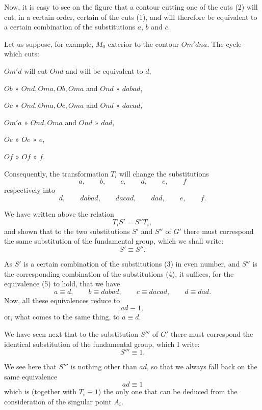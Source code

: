 \documentclass{article}
\begin{document}
Now, it is easy to see on the figure that a contour cutting one of the cuts (2) will cut, in a certain order, certain of the cuts (1), and will therefore be equivalent to a certain combination of the substitutions $a$, $b$ and $c$.

Let us suppose, for example, $M_{0}$ exterior to the contour $Om'dna$. The cycle which cuts:

$Om'd$ will cut $Ond$ and will be equivalent to $d$,

$Ob$ » $Ond, Oma, Ob, Oma$ and $Ond$ » $dabad$,

$Oc$ » $Ond, Oma, Oc, Oma$ and $Ond$ » $dacad$,

$Om'a$ » $Ond, Oma$ and $Ond$ » $dad$,

$Oe$ » $Oe$ » $e$,

$Of$ » $Of$ » $f$.

Consequently, the transformation $T_{i}$ will change the substitutions
\[ a, \qquad b, \qquad c, \qquad d, \qquad e, \qquad f \tag{3} \]
respectively into
\[ d, \qquad dabad, \qquad dacad, \qquad dad, \qquad e, \qquad f. \tag{4} \]


We have written above the relation
\[ T_{i}S' = S''T_{i}, \]
and shown that to the two substitutions $S'$ and $S''$ of $G'$ there must correspond the same substitution of the fundamental group, which we shall write:
\[ S' \equiv S''. \tag{5} \]

As $S'$ is a certain combination of the substitutions (3) in even number, and $S''$ is the corresponding combination of the substitutions (4), it suffices, for the equivalence (5) to hold, that we have
\[ a \equiv d, \qquad b \equiv dabad, \qquad c \equiv dacad, \qquad d \equiv dad. \]
Now, all these equivalences reduce to
\[ ad \equiv 1, \]
or, what comes to the same thing, to $a \equiv d$.

We have seen next that to the substitution $S'''$ of $G'$ there must correspond the identical substitution of the fundamental group, which I write:
\[ S''' \equiv 1. \]

We see here that $S'''$ is nothing other than $ad$, so that we always fall back on the same equivalence
\[ ad \equiv 1 \]
which is (together with $T_{i} \equiv 1$) the only one that can be deduced from the consideration of the singular point $A_{i}$.
\end{document}
